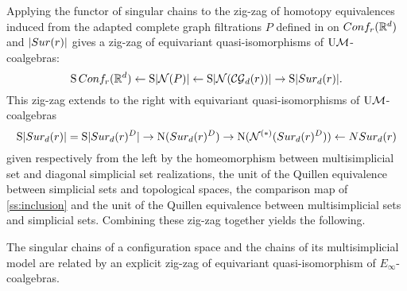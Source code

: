 Applying the functor of singular chains to the zig-zag of homotopy equivalences induced from the adapted complete graph filtrations $P$ defined in \cite{beuckelmann2021master} on $Conf_{r}(\mathbb{R}^d)$ and $\lvert Sur(r)\rvert$ gives a zig-zag of equivariant quasi-isomorphisms of $\mathrm{U}\mathcal{M}$-coalgebras:
\[
\operatorname{S}Conf_{r}(\mathbb{R}^d) \leftarrow 
\operatorname{S}\lvert\mathcal{N}(P)\rvert \leftarrow \operatorname{S} \lvert\mathcal{N}(\mathcal{CG}_{d}(r))\rvert \to \operatorname{S}\lvert Sur_{d}(r)\rvert.
\]
This zig-zag extends to the right with equivariant quasi-isomorphisms of $\mathrm{U}\mathcal{M}$-coalgebras
\[
\operatorname{S}\lvert Sur_{d}(r)\rvert= \operatorname{S} \lvert Sur_{d}(r)^{D}\rvert \to \operatorname{N}(Sur_{d}(r)^D) \to \operatorname{N}(\mathcal{N}^{(*)}(Sur_{d}(r)^D)) \leftarrow NSur_{d}(r)
\]
given respectively from the left by the homeomorphism between multisimplicial set and diagonal simplicial set realizations, the unit of the Quillen equivalence between simplicial sets and topological spaces, the comparison map of \cref{ss:inclusion} and the unit of the Quillen equivalence between multisimplicial sets and simplicial sets.
Combining these zig-zag together yields the following.
\begin{theorem}
	The singular chains of a configuration space and the chains of its multisimplicial model are related by an explicit zig-zag of equivariant quasi-isomorphism of $E_\infty$-coalgebras.
\end{theorem}

%
